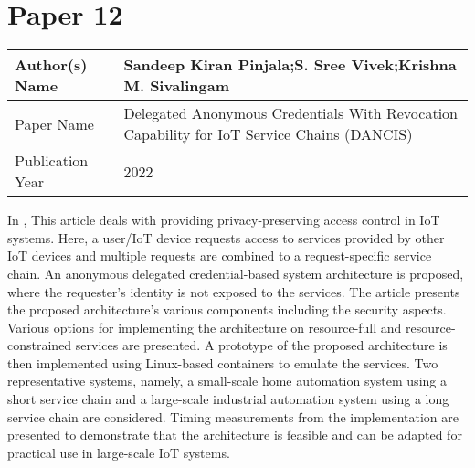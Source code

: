 \section{Paper 12}
    \begin{center}
    \begin{tabular}{ | m{5em} | m{25em} |} 
      \hline
      Author(s) Name &  Sandeep Kiran Pinjala;S. Sree Vivek;Krishna M. Sivalingam\\ 
      \hline
      Paper Name &  Delegated Anonymous Credentials With Revocation Capability for IoT Service Chains (DANCIS)\\ 
      \hline
      Publication Year &  2022\\ 
      \hline
    \end{tabular}
    \end{center}
    In \cite{9493760},  This article deals with providing privacy-preserving access control in \ac{IoT} systems. Here, a user/IoT device requests access to services provided by other IoT devices and multiple requests are combined to a request-specific service chain. An anonymous delegated credential-based system architecture is proposed, where the requester’s identity is not exposed to the services. The article presents the proposed architecture’s various components including the security aspects. Various options for implementing the architecture on resource-full and resource-constrained services are presented. A prototype of the proposed architecture is then implemented using Linux-based containers to emulate the services. Two representative systems, namely, a small-scale home automation system using a short service chain and a large-scale industrial automation system using a long service chain are considered. Timing measurements from the implementation are presented to demonstrate that the architecture is feasible and can be adapted for practical use in large-scale IoT systems.